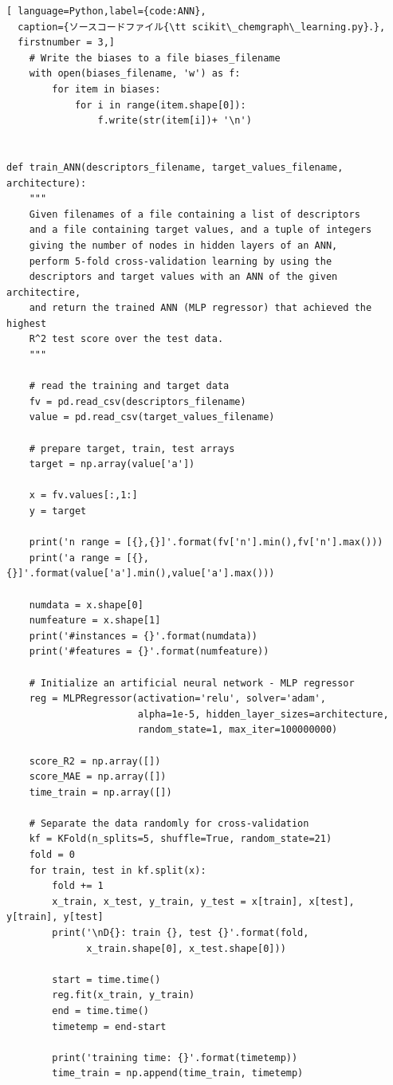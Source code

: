 \documentclass[11pt,titlepage,dvipdfmx,twoside]{jarticle}
\begin{document}
\begin{lstlisting}[ language=Python,label={code:ANN},
  caption={ソースコードファイル{\tt scikit\_chemgraph\_learning.py}．},
  firstnumber = 3,]
    # Write the biases to a file biases_filename
    with open(biases_filename, 'w') as f:
        for item in biases:
            for i in range(item.shape[0]):
                f.write(str(item[i])+ '\n')
    

def train_ANN(descriptors_filename, target_values_filename, architecture):
    """
    Given filenames of a file containing a list of descriptors
    and a file containing target values, and a tuple of integers
    giving the number of nodes in hidden layers of an ANN,
    perform 5-fold cross-validation learning by using the 
    descriptors and target values with an ANN of the given architectire,
    and return the trained ANN (MLP regressor) that achieved the highest
    R^2 test score over the test data.
    """
    
    # read the training and target data
    fv = pd.read_csv(descriptors_filename) 
    value = pd.read_csv(target_values_filename)       
    
    # prepare target, train, test arrays
    target = np.array(value['a'])
    
    x = fv.values[:,1:]
    y = target
    
    print('n range = [{},{}]'.format(fv['n'].min(),fv['n'].max()))
    print('a range = [{},{}]'.format(value['a'].min(),value['a'].max()))
    
    numdata = x.shape[0]
    numfeature = x.shape[1]
    print('#instances = {}'.format(numdata))
    print('#features = {}'.format(numfeature))
    
    # Initialize an artificial neural network - MLP regressor
    reg = MLPRegressor(activation='relu', solver='adam',
                       alpha=1e-5, hidden_layer_sizes=architecture,
                       random_state=1, max_iter=100000000)
    
    score_R2 = np.array([])
    score_MAE = np.array([])
    time_train = np.array([])
    
    # Separate the data randomly for cross-validation
    kf = KFold(n_splits=5, shuffle=True, random_state=21)
    fold = 0
    for train, test in kf.split(x):
        fold += 1
        x_train, x_test, y_train, y_test = x[train], x[test], y[train], y[test]
        print('\nD{}: train {}, test {}'.format(fold, 
              x_train.shape[0], x_test.shape[0]))
    
        start = time.time()
        reg.fit(x_train, y_train)
        end = time.time()
        timetemp = end-start
        
        print('training time: {}'.format(timetemp))
        time_train = np.append(time_train, timetemp)
    

\end{lstlisting}
\end{document}
